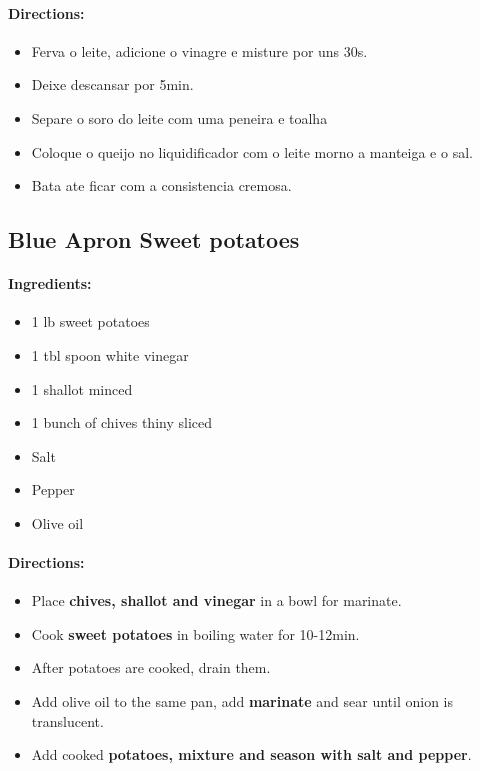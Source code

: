 \documentclass{article}
\begin{document}
\paragraph{Directions:}
\begin{itemize}
    \item Ferva o leite, adicione o vinagre e misture por uns 30s.
    \item Deixe descansar por 5min.
    \item Separe o soro do leite com uma peneira e toalha
    \item Coloque o queijo no liquidificador com o leite morno a manteiga e o sal.
    \item Bata ate ficar com a consistencia cremosa.
\end{itemize}

\subsection{Blue Apron Sweet potatoes}

\paragraph{Ingredients:}
\begin{itemize}
    \item 1 lb sweet potatoes
    \item 1 tbl spoon white vinegar
    \item 1 shallot minced
    \item 1 bunch of chives thiny sliced
    \item Salt
    \item Pepper
    \item Olive oil
\end{itemize}

\paragraph{Directions:}
\begin{itemize}
    \item Place \textbf{chives, shallot and vinegar} in a bowl for marinate.
    \item Cook \textbf{sweet potatoes} in boiling water for 10-12min.
    \item After potatoes are cooked, drain them.
    \item Add olive oil to the same pan, add \textbf{marinate} and sear until onion is translucent.
    \item Add cooked \textbf{potatoes, mixture and season with salt and pepper}.
\end{itemize}
\end{document}
